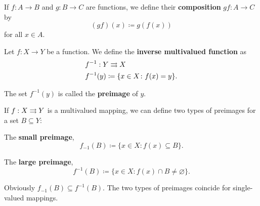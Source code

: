 \begin{definition}\label{def:function_composition}
  If \( f: A \to B \) and \( g: B \to C \) are functions, we define their \textbf{composition} \( gf: A \to C \) by
  \begin{equation*}
    (gf)(x) \coloneqq g(f(x))
  \end{equation*}
  for all \( x \in A \).
\end{definition}

\begin{definition}\label{def:function_preimage}
  Let \( f: X \to Y \) be a function. We define the \textbf{inverse multivalued function} as
  \begin{align*}
    &f^{-1} : Y \rightrightarrows X \\
    &f^{-1}(y) \coloneqq \{ x \in X \colon f(x) = y \}.
  \end{align*}

  The set \( f^{-1}(y) \) is called the \textbf{preimage} of \( y \).

  If \( f : X \rightrightarrows Y \) is a multivalued mapping, we can define two types of preimages for a set \( B \subseteq Y \):
  \begin{defenum}
    \item The \textbf{small preimage},
    \begin{equation*}
      f_{-1}(B) \coloneqq \{ x \in X \colon f(x) \subseteq B \}.
    \end{equation*}

    \item The \textbf{large preimage},
    \begin{equation*}
      f^{-1}(B) \coloneqq \{ x \in X \colon f(x) \cap B \neq \varnothing \}.
    \end{equation*}
  \end{defenum}

  Obviously \( f_{-1}(B) \subseteq f^{-1}(B) \). The two types of preimages coincide for single-valued mappings.
\end{definition}

